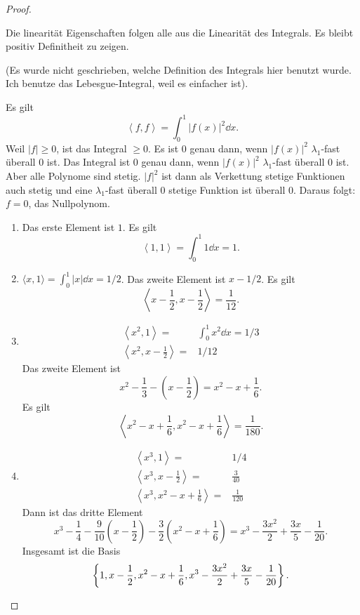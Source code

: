 \begin{proof}
	\begin{parts}
	\item Die linearität Eigenschaften folgen alle aus die Linearität des Integrals. Es bleibt positiv Definitheit zu zeigen.

		(Es wurde nicht geschrieben, welche Definition des Integrals hier benutzt wurde. Ich benutze das Lebesgue-Integral, weil es einfacher ist).
		
		Es gilt
		\[
			\left<f,f \right> =\int_0^1 |f(x)|^2\dd{x}
		.\] 
		Weil $|f|\ge 0$, ist das Integral $\ge 0$. Es ist $0$ genau dann, wenn $|f(x)|^2$ $\lambda_1$-fast überall $0$ ist. Das Integral ist $0$ genau dann, wenn $|f(x)|^2$ $\lambda_1$-fast überall $0$ ist. Aber alle Polynome sind stetig. $|f|^2$ ist dann als Verkettung stetige Funktionen auch stetig und eine $\lambda_1$-fast überall 0 stetige Funktion ist überall $0$. Daraus folgt: $f=0$, das Nullpolynom. 
	\item 
		\begin{enumerate}[label=(\roman*)]
			\item Das erste Element ist $1$. Es gilt
				\[
					\left<1,1 \right> = \int_0^1 1\dd{x}=1
				.\] 
			\item $\langle x,1\rangle=\int_0^1 |x|\dd{x}=1 / 2$. Das zweite Element ist $x-1 / 2$. Es gilt
				\[
				\left<x -\frac{1}{2},x-\frac{1}{2} \right> = \frac{1}{12}
				.\] 
			\item 
				\begin{align*}
					\left<x^2,1 \right> =& \int_0^1 x^2 \dd{x}=1 / 3\\
					\left<x^2, x - \frac{1}{2} \right> =& 1 / 12
				\end{align*}
				Das zweite Element ist
				\[
				x^2-\frac{1}{3}-(x-\frac{1}{2})=x^2-x+\frac{1}{6}
				.\] 
				Es gilt
				\[
				\left<x^2-x+\frac{1}{6},x^2-x+\frac{1}{6} \right> = \frac{1}{180}
				.\] 
			\item
				\begin{align*}
					\left<x^3,1 \right> =& 1 / 4\\
					\left<x^3, x - \frac{1}{2} \right> =& \frac{3}{40}\\
					\left<x^3, x^2-x+\frac{1}{6} \right> =&\frac{1}{120}
				\end{align*}
				Dann ist das dritte Element
				\[
					x^3-\frac{1}{4}-\frac{9}{10}\left( x-\frac{1}{2} \right) -\frac{3}{2}\left( x^2-x+\frac{1}{6} \right)=x^3-\frac{3x^2}{2}+\frac{3x}{5}-\frac{1}{20} 
				.\] 
				Insgesamt ist die Basis
				\[
				\left\{ 1,x-\frac{1}{2},x^2-x+\frac{1}{6},x^3-\frac{3x^2}{2}+\frac{3x}{5}-\frac{1}{20} \right\}  
				.\qedhere\] 
		\end{enumerate}
	\end{parts}
\end{proof}
